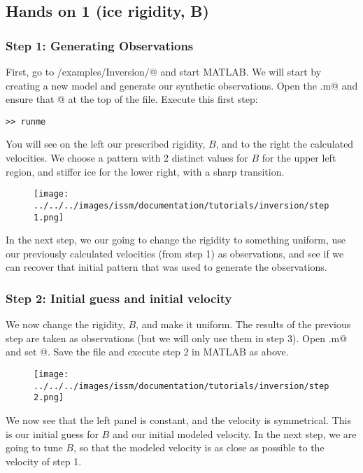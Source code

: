 \subsection{Hands on 1 (ice rigidity, B)} %
\subsubsection{Step 1: Generating Observations}
First, go to \verb@trunk/examples/Inversion/@ and start MATLAB. We will start by creating a new model and generate our synthetic observations.  Open the \verb@runme.m@ and ensure that @ at the top of the file. Execute this first step:
\begin{verbatim}>> runme\end{verbatim}
You will see on the left our prescribed rigidity, $B$, and to the right the calculated velocities. We choose a pattern with 2 distinct values for $B$ for the upper left region, and stiffer ice for the lower right, with a sharp transition.
\begin{figure}[H]
	\begin{center}
		\texttt{[image: ../../../images/issm/documentation/tutorials/inversion/step1.png]}
	\end{center}
\end{figure}
In the next step, we our going to change the rigidity to something uniform, use our previously calculated velocities (from step 1) as observations, and see if we can recover that initial pattern that was used to generate the observations.

\subsubsection{Step 2: Initial guess and initial velocity}
We now change the rigidity, $B$, and make it uniform. The results of the previous step are taken as observations (but we will only use them in step 3). Open \verb@runme.m@ and set @. Save the file and execute step 2 in MATLAB as above.
\begin{figure}[H]
	\begin{center}
		\texttt{[image: ../../../images/issm/documentation/tutorials/inversion/step2.png]}
	\end{center}
\end{figure}
We now see that the left panel is constant, and the velocity is symmetrical. This is our initial guess for $B$ and our initial modeled velocity. In the next step, we are going to tune $B$, so that the modeled velocity is as close as possible to the velocity of step 1.

